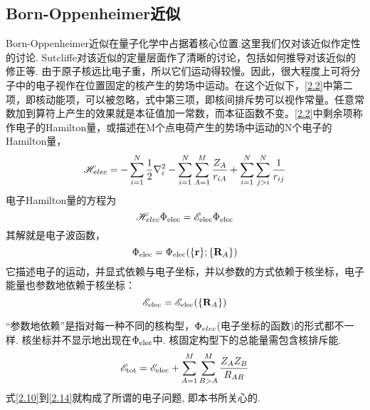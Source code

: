 \subsection{Born-Oppenheimer近似}
\label{sec2.1.2}
Born-Oppenheimer近似在量子化学中占据着核心位置.这里我们仅对该近似作定性的讨论. Sutcliffe对该近似的定量层面作了清晰的讨论，包括如何推导对该近似的修正等. 由于原子核远比电子重，所以它们运动得较慢。因此，很大程度上可将分子中的电子视作在位置固定的核产生的势场中运动。在这个近似下，\ref{2.2}中第二项，即核动能项，可以被忽略，式中第三项，即核间排斥势可以视作常量。任意常数加到算符上产生的效果就是本征值加一常数，而本征函数不变。\ref{2.2}中剩余项称作电子的Hamilton量，或描述在M个点电荷产生的势场中运动的N个电子的Hamilton量，
\begin{equation}
\label{2.10}
\mathscr{H}_{elec}=-\sum_{i=1}^{N}\frac{1}{2}\nabla_i^2 - \sum_{i=1}^{N}\sum_{A=1}^{M}\frac{Z_A}{r_{iA}} + \sum_{i=1}^{N}\sum_{j>i}^{N}\frac{1}{r_{ij}}
\end{equation}
电子Hamilton量的\sch 方程为
\begin{equation}
\label{2.11}
\mathscr{H}_{elec\rm}\Phi_{\rm elec}=\mathscr{E}_{\rm elec}\Phi_{\rm elec}
\end{equation}
其解就是电子波函数，
\begin{equation}
\label{2.12}
\Phi_{\rm elec}=\Phi_{\rm elec}(\{\mathbf{r}\};\{\mathbf{R}_A\})
\end{equation}
它描述电子的运动，并显式依赖与电子坐标，并以参数的方式依赖于核坐标，电子能量也参数地依赖于核坐标：
\begin{equation}
\label{2.13}
\mathscr{E}_{\rm elec}=\mathscr{E}_{\rm elec}(\{\mathbf{R}_A\})
\end{equation}

“参数地依赖”是指对每一种不同的核构型，$\Phi_{elec\rm}$(电子坐标的函数)的形式都不一样. 核坐标并不显示地出现在$\Phi_{\rm elec}$中. 核固定构型下的总能量需包含核排斥能.
\begin{equation}
\label{2.14}
\mathscr{E}_{\rm tot}=\mathscr{E}_{\rm elec}+\sum_{A=1}^{M}\sum_{B>A}^M\frac{Z_AZ_B}{R_{AB}}
\end{equation}
式\ref{2.10}到\ref{2.14}就构成了所谓的电子问题, 即本书所关心的.

